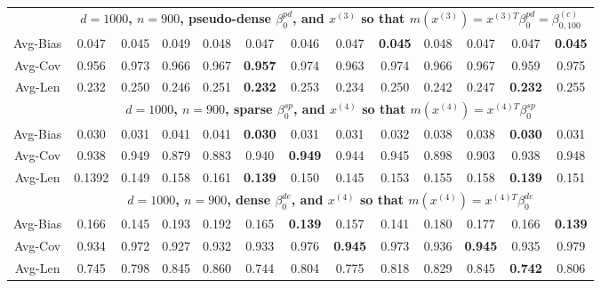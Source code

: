 \documentclass[ejsv2,noshowframe]{imsart}
\theoremstyle{plain}
\theoremstyle{definition}
\theoremstyle{remark}
\begin{document}
\begin{table}[hbtp!]
\begin{center}
{\begin{tabular}{ccccccccccccc}
				& \multicolumn{12}{c}{\bf $d=1000$, $n = 900$, pseudo-dense $\beta_0^{pd}$, and $x^{(3)}$ so that $m(x^{(3)})=x^{(3)T}\beta_0^{pd} = \beta_{0,100}^{(c)}$} \\ \cline{2-13}
				Avg-Bias & 0.047 & 0.045 & 0.049 & 0.048 & 0.047 & 0.046 & 0.047 & {\bf 0.045} & 0.048 & 0.047 & 0.047 & {\bf 0.045} \\
				Avg-Cov & 0.956 & 0.973 & 0.966 & 0.967 & {\bf 0.957} & 0.974 & 0.963 & 0.974 & 0.966 & 0.967 & 0.959 & 0.975 \\
				Avg-Len & 0.232 & 0.250 & 0.246 & 0.251 & {\bf 0.232} & 0.253 & 0.234 & 0.250 & 0.242 & 0.247 & {\bf 0.232} & 0.255 \\
				\hline
				
				& \multicolumn{12}{c}{\bf $d=1000$, $n = 900$, sparse $\beta_0^{sp}$, and $x^{(4)}$ so that $m(x^{(4)})=x^{(4)T}\beta_0^{sp}$} \\ \cline{2-13}
				Avg-Bias & 0.030 & 0.031 & 0.041 & 0.041 & {\bf 0.030} & 0.031 & 0.031 & 0.032 & 0.038 & 0.038 & {\bf 0.030} & 0.031 \\
				Avg-Cov & 0.938 & 0.949 & 0.879 & 0.883 & 0.940 & {\bf 0.949} & 0.944 & 0.945 & 0.898 & 0.903 & 0.938 & 0.948 \\
				Avg-Len & 0.1392 & 0.149 & 0.158 & 0.161 & {\bf 0.139} & 0.150 & 0.145 & 0.153 & 0.155 & 0.158 & {\bf 0.139} & 0.151 \\
				\cline{2-13}
				
				& \multicolumn{12}{c}{\bf $d=1000$, $n = 900$, dense $\beta_0^{de}$, and $x^{(4)}$ so that $m(x^{(4)})=x^{(4)T}\beta_0^{de}$} \\ \cline{2-13}
				Avg-Bias & 0.166 & 0.145 & 0.193 & 0.192 & 0.165 & {\bf 0.139} & 0.157 & 0.141 & 0.180 & 0.177 & 0.166 & {\bf 0.139} \\
				Avg-Cov & 0.934 & 0.972 & 0.927 & 0.932 & 0.933 & 0.976 & {\bf 0.945} & 0.973 & 0.936 & {\bf 0.945} & 0.935 & 0.979 \\
				Avg-Len & 0.745 & 0.798 & 0.845 & 0.860 & 0.744 & 0.804 & 0.775 & 0.818 & 0.829 & 0.845 & {\bf 0.742} & 0.806 \\
				\cline{2-13}
				

\end{tabular}}
\end{center}
\end{table}
\end{document}
